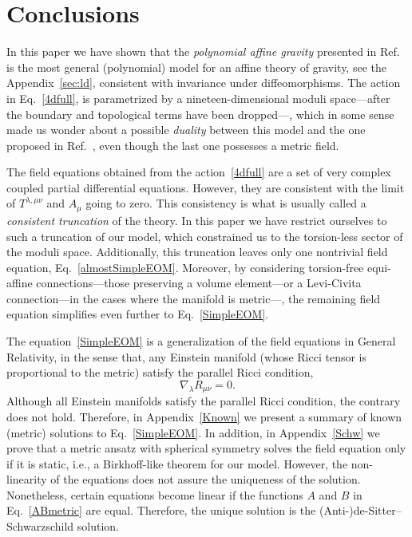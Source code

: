 \documentclass[aps,prd,12pt,twocolumn,superscriptaddress,showpacs,showkeys,reprint%
]{revtex4-1}
\newcommand\nab[1]{\nabla_{{#1}}}
\renewcommand{\(}{\left(}
\renewcommand{\)}{\right)}
\renewcommand{\[}{\left[}
\renewcommand{\]}{\right]}
\begin{document}
\section{\label{conclusions}Conclusions}

In this paper we have shown that the \emph{polynomial affine gravity} presented in Ref.~\cite{Skirzewski:2014eta} is the most general (polynomial) model for an affine theory of gravity, see the Appendix~\ref{sec:ld}, consistent with invariance under diffeomorphisms. The action in Eq.~\eqref{4dfull}, is parametrized by a nineteen-dimensional moduli space---after the boundary and topological terms have been dropped---, which in some sense made us wonder about a possible \emph{duality} between this model and the one proposed in Ref.~\cite{Pagani:2015ema}, even though the last one possesses a metric field.

The field equations obtained from the action~\eqref{4dfull} are a set of very complex coupled partial differential equations. However, they are consistent with the limit of $T^{\lambda,\mu\nu}$ and $A_\mu$ going to zero. This consistency is what is usually called a \emph{consistent truncation} of the theory. In this paper we have restrict ourselves to such a truncation of our model, which constrained us to the torsion-less sector of the moduli space. Additionally, this truncation leaves only one nontrivial field equation, Eq.~\eqref{almostSimpleEOM}.
Moreover, by considering torsion-free equi-affine connections---those preserving a volume element---or a Levi-Civita connection---in the cases where the manifold is metric---, the remaining field equation simplifies even further to Eq.~\eqref{SimpleEOM}.

The equation~\eqref{SimpleEOM} is a generalization of the field equations in General Relativity, in the sense that, any Einstein manifold (whose Ricci tensor is proportional to the metric) satisfy the parallel Ricci condition,
\begin{equation}
  \nab{\lambda} R_{\mu\nu} = 0.
\end{equation}
Although all Einstein manifolds satisfy the parallel Ricci condition, the contrary does not hold. Therefore, in Appendix~\ref{Known} we present a summary of known (metric) solutions to Eq.~\eqref{SimpleEOM}. In addition, in Appendix~\ref{Schw} we prove that a metric ansatz with spherical symmetry solves the field equation only if it is static, i.e., a Birkhoff-like theorem for our model. However, the non-linearity of the equations does not assure the uniqueness of the solution. Nonetheless, certain equations become linear if the functions $A$ and $B$ in Eq.~\eqref{ABmetric} are equal. Therefore, the unique solution is the (Anti-)de-Sitter--Schwarzschild solution.
\end{document}
